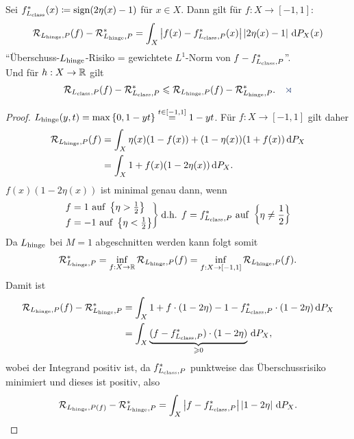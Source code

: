 \begin{prop}
\label{prop:2.2.8}
Sei $f^*_{L_{\mathrm{class}}}(x) \coloneq \operatorname{sign}(2\eta(x)-1)$ für $x\in X$. Dann gilt für $f:
X\to [-1,1]$:
\begin{align*}
\mathcal{R}_{L_{\mathrm{hinge}},P}(f) - \mathcal{R}_{L_{\mathrm{hinge}},P}^* =
\int_X \left|f(x)-f_{L_{\mathrm{class}},P}^*(x)\right|\left|2\eta(x)-1\right|\,\mathrm{d} P_X(x)
\end{align*}
"`Überschuss-$L_{\mathrm{hinge}}$-Risiko = gewichtete $L^1$-Norm von
$f-f_{L_{\mathrm{class}},P}^*$"'.\\
Und für $h: X\to\mathbb{R}$ gilt
\begin{align*}
\RR_{L_\class,P}(f) - \RR_{L_\class,P}^* \le
\RR_{L_\hinge,P}(f) - \RR_{L_\hinge,P}^*.\fishhere
\end{align*}
\end{prop}
\begin{proof}
$L_{\mathrm{hinge}}(y,t) = \max\left\{ 0,1-yt \right\} \overset{t\in[-1,1]}{=} 1-yt$. Für $f:
X\to[-1,1]$ gilt daher
\begin{align*}
\mathcal{R}_{L_{\mathrm{hinge}},P}(f) &= \int_X \eta(x)(1-f(x))+(1-\eta(x))(1+f(x))\,\mathrm{d} P_X\\
&= \int_X 1+f(x)(1-2\eta(x))\,\mathrm{d} P_X.
\end{align*}
$f(x)(1-2\eta(x))$ ist minimal genau dann, wenn
\begin{align*}
\begin{rcases}
f = 1\text{ auf } \left\{ \eta > \frac{1}{2} \right\}\\
f = -1 \text{ auf }  \left\{ \eta < \frac{1}{2} \right\}
\end{rcases}
\text{d.h. } f=f^*_{L_{\mathrm{class}},P}\text{ auf } \left\{ \eta \neq \frac{1}{2} \right\}
\end{align*}
Da $L_{\mathrm{hinge}}$ bei $M=1$ abgeschnitten werden kann folgt somit
\begin{align*}
\mathcal{R}_{L_{\mathrm{hinge}},P}^* = \inf_{f: X\to\mathbb{R}} \mathcal{R}_{L_{\mathrm{hinge}},P}(f) 
= \inf_{f: X\to [-1,1]} \mathcal{R}_{L_{\mathrm{hinge}},P}(f). 
\end{align*}
Damit ist
\begin{align*}
\mathcal{R}_{L_{\mathrm{hinge}},P}(f)- \mathcal{R}_{L_{\mathrm{hinge}},P}^* &= 
\int_X 1+ f\cdot(1-2\eta) - 1-f_{L_{\mathrm{class}},P}^*\cdot(1-2\eta)\,\mathrm{d} P_X\\
&= \int_X \underbrace{(f-f_{L_{\mathrm{class}},P}^*)\cdot(1-2\eta)}_{\geqslant 0}\,\mathrm{d} P_X,
\end{align*}
wobei der Integrand positiv ist, da $f_{L_{\mathrm{class}},P}^*$ punktweise das
Überschussrisiko minimiert und dieses ist positiv, also
\begin{align*}
\RR_{L_\hinge,P(f)}- \RR_{L_\hinge,P}^* =
\int_X \abs{f-f_{L_\class,P}^*}\abs{1-2\eta}\dP_X.

\end{align*}
\end{proof}
